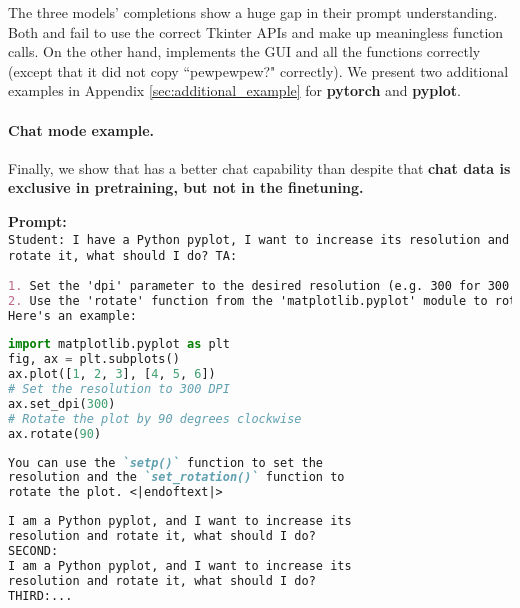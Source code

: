 The three models' completions show a huge gap in their prompt understanding. Both \phionebase and \phionesmall fail to use the correct Tkinter APIs and make up meaningless function calls. On the other hand, \phione implements the GUI and all the functions correctly (except that it did not copy ``pewpewpew?" correctly). We present two additional examples in Appendix \ref{sec:additional_example} for \textbf{pytorch} and \textbf{pyplot}.
\clearpage
\paragraph{Chat mode example.} Finally, we show that \phione has a better chat capability than \phionebase despite that \textbf{chat data is exclusive in  pretraining, but not in the finetuning.}

\begin{AIbox}{}
\textbf{Prompt:} \\
\tt{\footnotesize Student: I have a Python pyplot, I want to increase its resolution and rotate it, what should I do? TA:}
\\
\begin{minipage}[t]{0.5\linewidth}
\textbf{\phione}
\begin{lstlisting}[language=markdown, style=mystyle]
1. Set the 'dpi' parameter to the desired resolution (e.g. 300 for 300 DPI)
2. Use the 'rotate' function from the 'matplotlib.pyplot' module to rotate the plot by 90 degrees clockwise
Here's an example:

\end{lstlisting}\vspace{-1em}
\begin{lstlisting}[language=Python, style=mystyle]
import matplotlib.pyplot as plt
fig, ax = plt.subplots()
ax.plot([1, 2, 3], [4, 5, 6])
# Set the resolution to 300 DPI
ax.set_dpi(300)
# Rotate the plot by 90 degrees clockwise
ax.rotate(90)
\end{lstlisting}
\end{minipage}
\begin{minipage}[t]{0.5\linewidth}
\textbf{\phionebase}
\begin{lstlisting}[language=markdown, style=mystyle]
You can use the `setp()` function to set the 
resolution and the `set_rotation()` function to 
rotate the plot. <|endoftext|>
\end{lstlisting}
\textbf{\phionesmall}
\begin{lstlisting}[language=markdown, style=mystyle]
I am a Python pyplot, and I want to increase its 
resolution and rotate it, what should I do?
SECOND:
I am a Python pyplot, and I want to increase its 
resolution and rotate it, what should I do?
THIRD:...
\end{lstlisting}
\end{minipage}
\end{AIbox}

